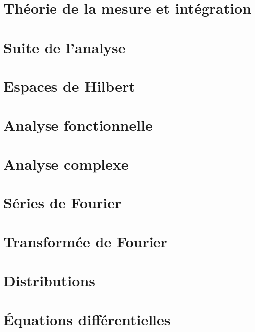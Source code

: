 \chapter{Théorie de la mesure et intégration}






\chapter{Suite de l'analyse}





\chapter{Espaces de Hilbert}


\chapter{Analyse fonctionnelle}



\chapter{Analyse complexe}



\chapter{Séries de Fourier}


\chapter{Transformée de Fourier}


\chapter{Distributions}


\chapter{Équations différentielles}


